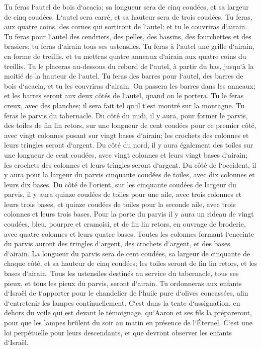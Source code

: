 \verse Tu feras l`autel de bois d`acacia; sa longueur sera de cinq coudées, et sa largeur de cinq coudées. L`autel sera carré, et sa hauteur sera de trois coudées. 
\verse Tu feras, aux quatre coins, des cornes qui sortiront de l`autel; et tu le couvriras d`airain. 
\verse Tu feras pour l`autel des cendriers, des pelles, des bassins, des fourchettes et des brasiers; tu feras d`airain tous ses ustensiles. 
\verse Tu feras à l`autel une grille d`airain, en forme de treillis, et tu mettras quatre anneaux d`airain aux quatre coins du treillis. 
\verse Tu le placeras au-dessous du rebord de l`autel, à partir du bas, jusqu`à la moitié de la hauteur de l`autel. 
\verse Tu feras des barres pour l`autel, des barres de bois d`acacia, et tu les couvriras d`airain. 
\verse On passera les barres dans les anneaux; et les barres seront aux deux côtés de l`autel, quand on le portera. 
\verse Tu le feras creux, avec des planches; il sera fait tel qu`il t`est montré sur la montagne. 
\verse Tu feras le parvis du tabernacle. Du côté du midi, il y aura, pour former le parvis, des toiles de fin lin retors, sur une longueur de cent coudées pour ce premier côté, 
\verse avec vingt colonnes posant sur vingt bases d`airain; les crochets des colonnes et leurs tringles seront d`argent. 
\verse Du côté du nord, il y aura également des toiles sur une longueur de cent coudées, avec vingt colonnes et leurs vingt bases d`airain; les crochets des colonnes et leurs tringles seront d`argent. 
\verse Du côté de l`occident, il y aura pour la largeur du parvis cinquante coudées de toiles, avec dix colonnes et leurs dix bases. 
\verse Du côté de l`orient, sur les cinquante coudées de largeur du parvis, 
\verse il y aura quinze coudées de toiles pour une aile, avec trois colonnes et leurs trois bases, 
\verse et quinze coudées de toiles pour la seconde aile, avec trois colonnes et leurs trois bases. 
\verse Pour la porte du parvis il y aura un rideau de vingt coudées, bleu, pourpre et cramoisi, et de fin lin retors, en ouvrage de broderie, avec quatre colonnes et leurs quatre bases. 
\verse Toutes les colonnes formant l`enceinte du parvis auront des tringles d`argent, des crochets d`argent, et des bases d`airain. 
\verse La longueur du parvis sera de cent coudées, sa largeur de cinquante de chaque côté, et sa hauteur de cinq coudées; les toiles seront de fin lin retors, et les bases d`airain. 
\verse Tous les ustensiles destinés au service du tabernacle, tous ses pieux, et tous les pieux du parvis, seront d`airain. 
\verse Tu ordonneras aux enfants d`Israël de t`apporter pour le chandelier de l`huile pure d`olives concassées, afin d`entretenir les lampes continuellement. 
\verse C`est dans la tente d`assignation, en dehors du voile qui est devant le témoignage, qu`Aaron et ses fils la prépareront, pour que les lampes brûlent du soir au matin en présence de l`Éternel. C`est une loi perpétuelle pour leurs descendants, et que devront observer les enfants d`Israël. 

